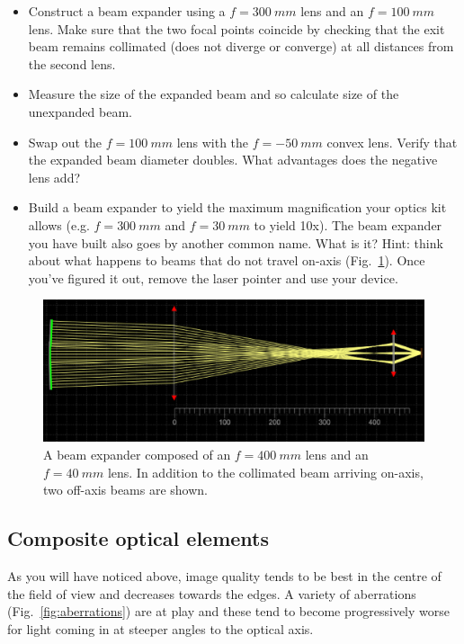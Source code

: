 \documentclass[a4paper]{report}
\begin{document}
\begin{itemize}
\item Construct a beam expander using a $f=300~mm$ lens and an $f=100~mm$ lens.
Make sure that the two focal points coincide by checking that the exit beam remains collimated (does not diverge or converge)
at all distances from the second lens. 
\item Measure the size of the expanded beam and so calculate size of the unexpanded beam.
\item Swap out the $f=100~mm$ lens with the $f=-50~mm$ convex lens. Verify that the expanded beam diameter doubles. 
What advantages does the negative lens add?
\item Build a beam expander to yield the maximum magnification your optics kit allows (e.g. $f=300~mm$ and $f=30~mm$ to yield 10x). 
The beam expander you have built also goes by another common name.  What is it? 
Hint: think about what happens to beams that do not travel on-axis (Fig.~\ref{fig:telescope}).
Once you've figured it out, remove the laser pointer and use your device. 
\end{itemize}


\begin{figure}[h]
\center
\includegraphics[width=4.5in]{telescope_ray_diag.eps}
\caption{A beam expander composed of an $f=400~mm$ lens and an $f=40~mm$ lens. 
In addition to the collimated beam arriving on-axis, two off-axis beams are shown.}
\label{fig:telescope}
\end{figure}

\clearpage



\subsection{Composite optical elements}
As you will have noticed above, image quality tends to be best in the centre of the field of view and decreases towards the edges. 
A variety of aberrations (Fig.~\ref{fig:aberrations}) are at play and these tend to become progressively worse for light coming in at steeper angles to the optical axis.
\end{document}
